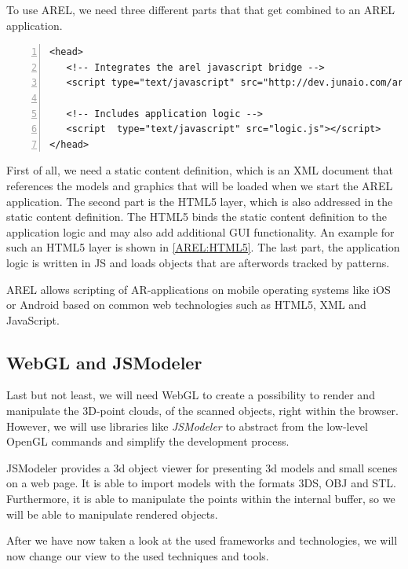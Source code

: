 To use \ac{AREL}, we need three different parts that that get combined to an \ac{AREL} application.

\begin{lstlisting}[numbers=left,caption={Example for the HTML5 AREL layer},label=AREL:HTML5,frame=tlbr,breaklines]
<head>
   <!-- Integrates the arel javascript bridge -->
   <script type="text/javascript" src="http://dev.junaio.com/arel/js/arel.js"></script>

   <!-- Includes application logic -->
   <script  type="text/javascript" src="logic.js"></script>
</head>
\end{lstlisting}

First of all, we need a static content definition, which is an \ac{XML} document that references the models and graphics that will be loaded when we start the \ac{AREL} application. The second part is the \ac{HTML5} layer, which is also addressed in the static content definition. The \ac{HTML5} binds the static content definition to the application logic and may also add additional \ac{GUI} functionality. An example for such an \ac{HTML5} layer is shown in \ref{AREL:HTML5}. The last part, the application logic is written in \ac{JS} and loads objects that are afterwords tracked by patterns.  

\ac{AREL} allows scripting of \ac{AR}-applications on mobile operating systems like iOS or Android based on common web technologies such as \ac{HTML5}, \ac{XML} and JavaScript. 

\subsection{WebGL and JSModeler}
Last but not least, we will need \ac{WebGL} to create a possibility to render and manipulate the 3D-point clouds, of the scanned objects, right within the browser. However, we will use libraries like \emph{JSModeler} to abstract from the low-level OpenGL commands and simplify the development process.

JSModeler provides a 3d object viewer for presenting 3d models and small scenes on a web page. It is able to import models with the formats 3DS, OBJ and STL. Furthermore, it is able to manipulate the points within the internal buffer, so we will be able to manipulate rendered objects. 

After we have now taken a look at the used frameworks and technologies, we will now change our view to the used techniques and tools.

